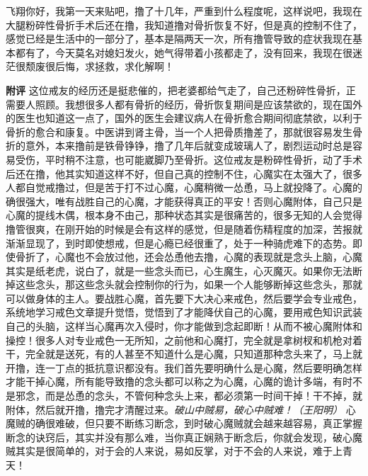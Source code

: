 \begin{case}
    飞翔你好，我第一天来贴吧，撸了十几年，严重到什么程度呢，这样说吧，我现在大腿粉碎性骨折手术后还在撸，我知道撸对骨折恢复不好，但是真的控制不住了，感觉已经是生活中的一部分了，基本是隔两天一次，所有撸管导致的症状我现在基本都有了，今天莫名对媳妇发火，她气得带着小孩都走了，没有回来，我现在很迷茫很颓废很后悔，求拯救，求化解啊！

    \textbf{附评} 这位戒友的经历还是挺悲催的，把老婆都给气走了，自己还粉碎性骨折，正需要人照顾。我想很多人都有骨折的经历，骨折恢复期间是应该禁欲的，现在国外的医生也知道这一点了，国外的医生会建议病人在骨折愈合期间彻底禁欲，以利于骨折的愈合和康复。中医讲到肾主骨，当一个人把骨质撸差了，那就很容易发生骨折的意外，本来撸前是铁骨铮铮，撸了几年后就变成玻璃人了，剧烈运动时总是容易受伤，平时稍不注意，也可能崴脚乃至骨折。这位戒友是粉碎性骨折，动了手术后还在撸，他其实知道这样不好，但自己真的控制不住，心魔实在太强大了，很多人都自觉戒撸过，但是苦于打不过心魔，心魔稍微一怂恿，马上就投降了。心魔的确很强大，唯有战胜自己的心魔，才能获得真正的平安！否则心魔附体，自己只是心魔的提线木偶，根本身不由己，那种状态其实是很痛苦的，很多无知的人会觉得撸管很爽，在刚开始的时候是会有这样的感觉，但是随着伤精程度的加深，苦报就渐渐显现了，到时即使想戒，但是心瘾已经很重了，处于一种骑虎难下的态势。即使骨折了，心魔也不会放过他，还会怂恿他去撸，心魔的表现就是念头上脑，心魔其实是纸老虎，说白了，就是一些念头而已，心生魔生，心灭魔灭。如果你无法断掉这些念头，那这些念头就会控制你的行为，如果一个人能够断掉这些念头，那就可以做身体的主人。要战胜心魔，首先要下大决心来戒色，然后要学会专业戒色，系统地学习戒色文章提升觉悟，觉悟到了才能降伏自己的心魔，要用戒色知识武装自己的头脑，这样当心魔再次入侵时，你才能做到念起即断！从而不被心魔附体和操控！很多人对专业戒色一无所知，之前他和心魔打，完全就是拿树杈和机枪对着干，完全就是送死，有的人甚至不知道什么是心魔，只知道那种念头来了，马上就开撸，连一丁点的抵抗意识都没有。我们首先要明确什么是心魔，然后要明确怎样才能干掉心魔，所有能导致撸的念头都可以称之为心魔，心魔的诡计多端，有时不是邪念，而是怂恿的念头，不管何种念头上来，都必须第一时间干掉！干不掉，就附体，然后就开撸，撸完才清醒过来。\textit{破山中贼易，破心中贼难！（王阳明）} 心魔贼的确很难破，但只要不断练习断念，到时破心魔贼就会越来越容易，真正掌握断念的诀窍后，其实并没有那么难，当你真正娴熟于断念后，你就会发现，破心魔贼其实是很简单的，对于会的人来说，易如反掌，对于不会的人来说，难于上青天！
\end{case}

